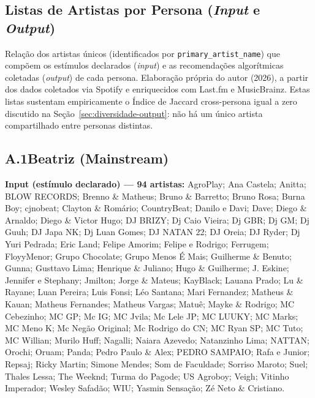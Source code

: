 \begin{apendicesenv}
\chapter{Listas de Artistas por Persona (\emph{Input} e \emph{Output})}

\noindent Relação dos artistas únicos (identificados por \texttt{primary\_artist\_name}) que compõem os estímulos declarados (\emph{input}) e as recomendações algorítmicas coletadas (\emph{output}) de cada persona. Elaboração própria do autor (2026), a partir dos dados coletados via Spotify e enriquecidos com Last.fm e MusicBrainz. Estas listas sustentam empiricamente o Índice de Jaccard cross-persona igual a zero discutido na Seção~\ref{sec:diversidade-output}: não há um único artista compartilhado entre personas distintas.

\section*{A.1\quad Beatriz (Mainstream)}

\noindent\textbf{Input (estímulo declarado) --- 94 artistas:} AgroPlay; Ana Castela; Anitta; BLOW RECORDS; Brenno \& Matheus; Bruno \& Barretto; Bruno Rosa; Burna Boy; cjnobeat; Clayton \& Romário; CountryBeat; Danilo e Davi; Dave; Diego \& Arnaldo; Diego \& Victor Hugo; DJ BRIZY; Dj Caio Vieira; Dj GBR; Dj GM; Dj Guuh; DJ Japa NK; Dj Luan Gomes; DJ NATAN 22; DJ Oreia; DJ Ryder; Dj Yuri Pedrada; Eric Land; Felipe Amorim; Felipe e Rodrigo; Ferrugem; FloyyMenor; Grupo Chocolate; Grupo Menos É Mais; Guilherme \& Benuto; Gunna; Gusttavo Lima; Henrique \& Juliano; Hugo \& Guilherme; J. Eskine; Jennifer e Stephany; Jmilton; Jorge \& Mateus; KayBlack; Lauana Prado; Lu \& Rayane; Luan Pereira; Luis Fonsi; Léo Santana; Mari Fernandez; Matheus \& Kauan; Matheus Fernandes; Matheus Vargas; Matuê; Mayke \& Rodrigo; MC Cebezinho; MC GP; Mc IG; MC Jvila; Mc Lele JP; MC LUUKY; MC Marks; MC Meno K; Mc Negão Original; Mc Rodrigo do CN; MC Ryan SP; MC Tuto; MC Willian; Murilo Huff; Nagalli; Naiara Azevedo; Natanzinho Lima; NATTAN; Orochi; Oruam; Panda; Pedro Paulo \& Alex; PEDRO SAMPAIO; Rafa e Junior; Repsaj; Ricky Martin; Simone Mendes; Som de Faculdade; Sorriso Maroto; Suel; Thales Lessa; The Weeknd; Turma do Pagode; US Agroboy; Veigh; Vitinho Imperador; Wesley Safadão; WIU; Yasmin Sensação; Zé Neto \& Cristiano.



\end{apendicesenv}
